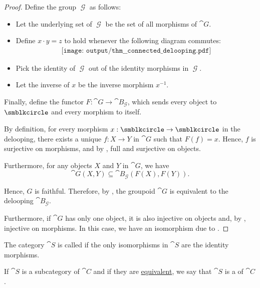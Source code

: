 \begin{proof}
  Define the group \( \mscrG \) as follows:
  \begin{itemize}
    \item Let the underlying set of \( \mscrG \) be the set of all morphisms of \( \cat{G} \).
    \item Define \( x \cdot y = z \) to hold whenever the following diagram commutes:
    \begin{equation}\label{eq:thm:connected_delooping/mult}
      \begin{aligned}
        \texttt{[image: output/thm\_\_connected\_delooping.pdf]}
      \end{aligned}
    \end{equation}
    \item Pick the identity of \( \mscrG \) out of the identity morphisms in \( \mscrG \).
    \item Let the inverse of \( x \) be the inverse morphism \( x^{-1} \).
  \end{itemize}

  Finally, define the functor \( F: \cat{G} \to \cat{B}_\mscrG \), which sends every object to \( \anon \) and every morphism to itself.

  By definition, for every morphism \( x: \anon \to \anon \) in the delooping, there exists a unique \( f: X \to Y \) in \( \cat{G} \) such that \( F(f) = x \). Hence, \( f \) is surjective on morphisms, and by , full and surjective on objects.

  Furthermore, for any objects \( X \) and \( Y \) in \( \cat{G} \), we have
  \begin{equation*}
    \cat{G}(X, Y) \subseteq \cat{B}_\mscrG(F(X), F(Y)).
  \end{equation*}

  Hence, \( G \) is faithful. Therefore, by , the groupoid \( \cat{G} \) is equivalent to the delooping \( \cat{B}_\mscrG \).

  Furthermore, if \( \cat{G} \) has only one object, it is also injective on objects and, by , injective on morphisms. In this case, we have an isomorphism due to .
\end{proof}

\begin{definition}\label{def:skeletal_category}
  The category \( \cat{S} \) is called  if the only isomorphisms in \( \cat{S} \) are the identity morphisms.

  If \( \cat{S} \) is a subcategory of \( \cat{C} \) and if they are \hyperref[def:category_equivalence]{equivalent}, we say that \( \cat{S} \) is a  of \( \cat{C} \).
\end{definition}

